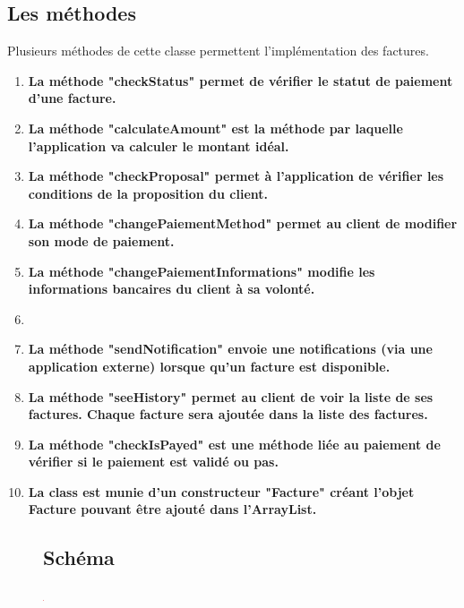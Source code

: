 \subsection{Les méthodes}
\begin{flushleft}
Plusieurs méthodes de cette classe permettent l'implémentation des factures.
\end{flushleft}

\begin{enumerate}[-]

\item \textbf{La méthode "checkStatus" permet de vérifier le statut de paiement d'une facture.}

\item \textbf{La méthode "calculateAmount" est la méthode par laquelle l'application va calculer le montant idéal.}

\item \textbf{La méthode "checkProposal" permet à l'application de vérifier les conditions de la proposition du client.}

\item \textbf{La méthode "changePaiementMethod" permet au client de modifier son mode de paiement.}

\item \textbf{La méthode "changePaiementInformations" modifie les informations bancaires du client à sa volonté.}

\item {}

\item \textbf{La méthode "sendNotification" envoie une notifications (via une application externe) lorsque qu'un facture est disponible.}

\item \textbf{La méthode "seeHistory" permet au client de voir la liste de ses factures. Chaque facture sera ajoutée dans la liste des factures.}

\item \textbf{La méthode "checkIsPayed" est une méthode liée au paiement de vérifier si le paiement est validé ou pas.}

\item \textbf{La class est munie d'un constructeur "Facture" créant l'objet Facture pouvant être ajouté dans l'ArrayList.}

\end{enumerate}

\begin{figure}[h]
\subsection{Schéma}
\centering
\includegraphics[width = 1]{extension-maxime/class/img/class-extension.png}
\end{figure}


